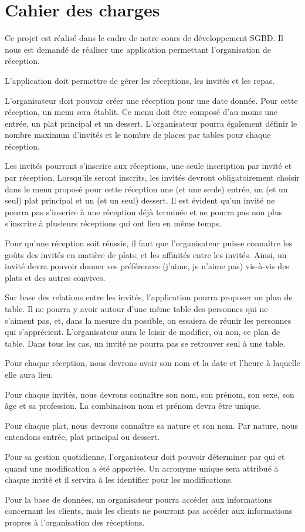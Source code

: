\chapter{Cahier des charges}

Ce projet est réalisé dans le cadre de notre cours de développement SGBD. Il nous est demandé de réaliser une application permettant l'organisation de réception.

L'application doit permettre de gérer les réceptions, les invités et les repas.

L'organisateur doit pouvoir créer une réception pour une date donnée. Pour cette réception, un menu sera établit. Ce menu doit être composé d'au moins une entrée, un plat principal et un dessert. L'organisateur pourra également définir le nombre maximum d'invités et le nombre de places par tables pour chaque réception.

Les invités pourront s'inscrire aux réceptions, une seule inscription par invité et par réception. Lorsqu'ils seront inscrits, les invités devront obligatoirement choisir dans le menu proposé pour cette réception une (et une seule) entrée, un (et un seul) plat principal et un (et un seul) dessert. Il est évident qu'un invité ne pourra pas s'inscrire à une réception déjà terminée et ne pourra pas non plus s'inscrire à plusieurs réceptions qui ont lieu en même temps.

Pour qu'une réception soit réussie, il faut que l'organisateur puisse connaître les goûts des invités en matière de plats, et les affinités entre les invités. Ainsi, un invité devra pouvoir donner ses préférences (\og{}j'aime\fg{}, \og{}je n'aime pas\fg{}) vis-à-vis des plats et des autres convives.

Sur base des relations entre les invités, l'application pourra proposer un plan de table. Il ne pourra y avoir autour d'une même table des personnes qui ne s'aiment pas, et, dans la mesure du possible, on essaiera de réunir les personnes qui s'apprécient. L'organisateur aura le loisir de modifier, ou non, ce plan de table. Dans tous les cas, un invité ne pourra pas se retrouver seul à une table.

Pour chaque réception, nous devrons avoir son nom et la date et l'heure à laquelle elle aura lieu.

Pour chaque invités,  nous devrons connaître son nom, son prénom, son sexe, son âge et sa profession. La combinaison \og{}nom\fg{} et \og{}prénom\fg{} devra être unique.

Pour chaque plat, nous devrons connaître sa nature et son nom. Par nature, nous entendons \og{}entrée\fg{}, \og{}plat principal\fg{} ou \og{}dessert\fg{}.

Pour sa gestion quotidienne, l'organisateur doit pouvoir déterminer par qui et quand une modification a été apportée. Un acronyme unique sera attribué à chaque invité et il servira à les identifier pour les modifications.

Pour la base de données, un organisateur pourra accéder aux informations concernant les clients, mais les clients ne pourront pas accéder aux informations propres à l'organisation des réceptions.
